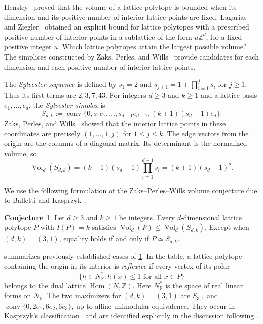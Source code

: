 \documentclass[reqno, 11pt]{article}
\numberwithin{equation}{section}
\theoremstyle{definition}
\newtheorem{conjecture}[conjecture]{Conjecture}
\newcommand{\R}{\mathbb R}
\newcommand{\Z}{\mathbb Z}
\DeclareMathOperator{\conv}{conv}
\DeclareMathOperator{\Vol}{Vol}
\begin{document}
Hensley~\cite[Theorem~3.6]{Hensley} proved that the volume of a
lattice polytope is bounded when its dimension and its positive
number of interior lattice points are fixed. Lagarias and
Ziegler~\cite[Theorem~1]{LZ} obtained an explicit bound for
lattice polytopes with a prescribed positive number of interior
points in a sublattice of the form $u\Z^d$, for a fixed positive
integer $u$. Which lattice polytopes attain the largest possible
volume? The simplices constructed by Zaks, Perles, and Wills~\cite{ZPW}
provide candidates for each dimension and each positive number of
interior lattice points.

The \emph{Sylvester sequence} is defined by $s_1=2$ and
$s_{j+1}=1+\prod_{i=1}^{j}s_i$ for $j\ge1$. Thus its first terms are
$2,3,7,43$. For integers $d\ge3$ and $k\ge1$ and a lattice basis
$e_1,\ldots,e_d$, the \emph{Sylvester simplex} is
\[
 S_{d,k}:=\conv\{0,s_1e_1,\ldots,s_{d-1}e_{d-1},
                           (k+1)(s_d-1)e_d\}.
\]
Zaks, Perles, and Wills~\cite[p.~45]{ZPW} showed that the interior
lattice points in these coordinates are precisely $(1,\ldots,1,j)$
for $1\le j\le k$. The edge vectors from the origin
are the columns of a diagonal matrix. Its determinant is the
normalized volume, so
\[
 \Vol_d(S_{d,k})
  =(k+1)(s_d-1)\prod_{i=1}^{d-1}s_i=(k+1)(s_d-1)^2 .
\]

We use the following formulation of the Zaks--Perles--Wills volume
conjecture due to Balletti and Kasprzyk~\cite[Conjecture~1.5]{BK}.

\begin{conjecture}\label{conj:zpw}
Let $d\ge3$ and $k\ge1$ be integers. Every $d$-dimensional lattice
polytope $P$ with $I(P)=k$ satisfies
$\Vol_d(P)\le\Vol_d(S_{d,k})$. Except when $(d,k)=(3,1)$,
equality holds if and only if $P\simeq S_{d,k}$.
\end{conjecture}

 summarizes previously established cases of
\cref{conj:zpw}. In the table, a lattice
polytope containing the origin in its interior is \emph{reflexive}
if every vertex of its polar
\[
  \{h\in N_{\R}^{*}:h(x)\le1\text{ for all }x\in P\}
\]
belongs to the dual lattice $\operatorname{Hom}(N,\Z)$. Here
$N_{\R}^{*}$ is the space of real linear forms on $N_{\R}$. The two maximizers for
$(d,k)=(3,1)$ are $S_{3,1}$ and $\conv\{0,2e_1,6e_2,6e_3\}$,
up to affine unimodular equivalence. They occur in Kasprzyk's
classification~\cite{Kasprzyk} and are identified explicitly in
the discussion following \cite[Conjecture~1.5]{BK}.
\end{document}
